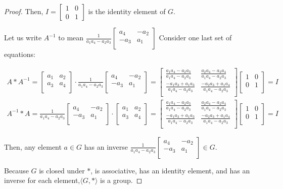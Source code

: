 \documentclass[12pt]{article}
\newcommand{\ainverse}{\frac{1}{a_1 a_4 - a_2 a_3}\begin{bmatrix} a_4 & -a_2 \\ -a_3 & a_1 \\ \end{bmatrix}}
\begin{document}
\begin{proof}
	Then, $I = \begin{bmatrix} 1 & 0 \\ 0 & 1 \end{bmatrix}$ is the identity element of $G$.

	
	Let us write $A^{-1}$ to mean $\ainverse$
	Consider one last set of equations:

\begin{align}
	\label{eq:inv1}
	A * A^{-1} =
	\begin{bmatrix} a_1 & a_2 \\ a_3 & a_4 \\ \end{bmatrix}
	\cdot
	\ainverse
	=
\begin{bmatrix}
	\frac{a_1 a_4 -a_2 a_3 }{a_1 a_4 -a_2 a_3 } & \frac{a_2 a_4 -a_2 a_4 }{a_1 a_4 -a_2 a_3 } \\
	\frac{-a_1 a_3 +a_1 a_3 }{a_1 a_4 -a_2 a_3 } & \frac{-a_2 a_3 +a_1 a_4 }{a_1 a_4  - a_2 a_3 } \\
\end{bmatrix}
	\begin{bmatrix} 1 & 0 \\ 0 & 1 \\ \end{bmatrix}
	= I \\
	\label{eq:inv2}
	A^{-1} * A =
	\ainverse
	\cdot
	\begin{bmatrix} a_1 & a_2 \\ a_3 & a_4 \\ \end{bmatrix}
	=
\begin{bmatrix}
	\frac{a_1 a_4 -a_2 a_3 }{a_1 a_4 -a_2 a_3 } & \frac{a_2 a_4 -a_2 a_4 }{a_1 a_4 -a_2 a_3 } \\
	\frac{-a_1 a_3 +a_1 a_3 }{a_1 a_4 -a_2 a_3 } & \frac{-a_2 a_3 +a_1 a_4 }{a_1 a_4  - a_2 a_3 } \\
\end{bmatrix}
	\begin{bmatrix} 1 & 0 \\ 0 & 1 \\ \end{bmatrix}
	= I
\end{align}

Then, any element $a \in G$ has an inverse $\ainverse \in G$.

Because $G$ is closed under $*$, is associative, has an identity element, and has an inverse for each element,$\langle G, * \rangle$ is a group.
	

\end{proof}
\end{document}
